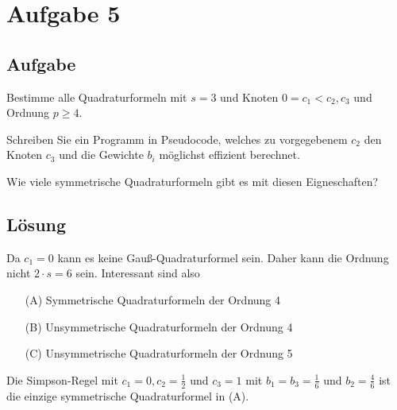 \section*{Aufgabe 5}
\subsection*{Aufgabe}
Bestimme alle Quadraturformeln mit $s=3$ und Knoten
$0 = c_1 < c_2, c_3$ und Ordnung $p \geq 4$.

Schreiben Sie ein Programm in Pseudocode, welches zu vorgegebenem
$c_2$ den Knoten $c_3$ und die Gewichte $b_i$ möglichst effizient
berechnet.

Wie viele symmetrische Quadraturformeln gibt es mit diesen Eigneschaften?

\subsection*{Lösung}
Da $c_1 = 0$ kann es keine Gauß-Quadraturformel sein. Daher kann
die Ordnung nicht $2 \cdot s = 6$ sein. Interessant sind also
\begin{itemize}
    \item[(A)] Symmetrische Quadraturformeln der Ordnung 4
    \item[(B)] Unsymmetrische Quadraturformeln der Ordnung 4
    \item[(C)] Unsymmetrische Quadraturformeln der Ordnung 5
\end{itemize}

Die Simpson-Regel mit $c_1 = 0, c_2 = \frac{1}{2}$ und $c_3 = 1$
mit $b_1 = b_3 = \frac{1}{6}$ und $b_2 = \frac{4}{6}$ ist die einzige
symmetrische Quadraturformel in (A).

